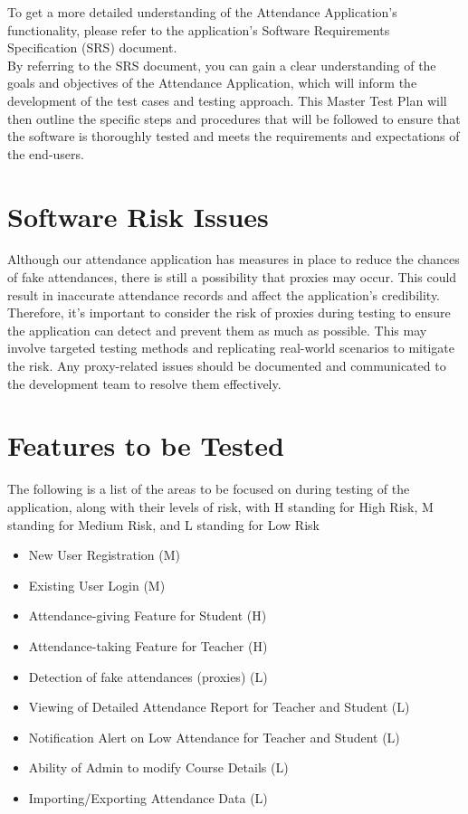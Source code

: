 \documentclass{scrreprt}
\begin{document}
To get a more detailed understanding of the Attendance Application's functionality, please refer to the application's Software Requirements Specification (SRS) document.\\

By referring to the SRS document, you can gain a clear understanding of the goals and objectives of the Attendance Application, which will inform the development of the test cases and testing approach. This Master Test Plan will then outline the specific steps and procedures that will be followed to ensure that the software is thoroughly tested and meets the requirements and expectations of the end-users.

\pagebreak

\chapter{Software Risk Issues}
Although our attendance application has measures in place to reduce the chances of fake attendances, there is still a possibility that proxies may occur. This could result in inaccurate attendance records and affect the application's credibility. Therefore, it's important to consider the risk of proxies during testing to ensure the application can detect and prevent them as much as possible. This may involve targeted testing methods and replicating real-world scenarios to mitigate the risk. Any proxy-related issues should be documented and communicated to the development team to resolve them effectively.

\chapter{Features to be Tested}
The following is a list of the areas to be focused on during testing of the application, along with their levels of risk, with H standing for High Risk, M standing for Medium Risk, and L standing for Low Risk 
\begin{itemize}
\item New User Registration (M)
\item Existing User Login (M)
\item Attendance-giving Feature for Student (H)
\item Attendance-taking Feature for Teacher (H)
\item Detection of fake attendances (proxies) (L)
\item Viewing of Detailed Attendance Report for Teacher and Student (L)
\item Notification Alert on Low Attendance for Teacher and Student (L)
\item Ability of Admin to modify Course Details (L)
\item Importing/Exporting Attendance Data (L)
\end{itemize}
\end{document}
